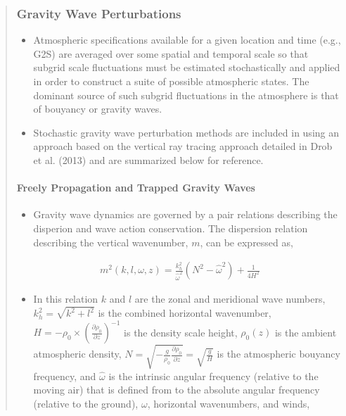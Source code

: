 \documentclass[letterpaper,10pt,english]{sphinxmanual}
\begin{document}
\begin{itemize}
\begin{quote}
\subsubsection{Gravity Wave Perturbations}
\label{\detokenize{gravity:gravity-wave-perturbations}}\label{\detokenize{gravity:gravity}}\label{\detokenize{gravity::doc}}\begin{itemize}
\item {} 
\sphinxAtStartPar
Atmospheric specifications available for a given location and time (e.g., G2S) are averaged over some spatial and temporal scale so that sub\sphinxhyphen{}grid scale fluctuations must be estimated stochastically and applied in order to construct a suite of possible atmospheric states.  The dominant source of such sub\sphinxhyphen{}grid fluctuations in the atmosphere is that of bouyancy or gravity waves.

\item {} 
\sphinxAtStartPar
Stochastic gravity wave perturbation methods are included in  using an approach based on the vertical ray tracing approach detailed in Drob et al. (2013) and are summarized below for reference.

\end{itemize}


\paragraph{Freely Propagation and Trapped Gravity Waves}
\label{\detokenize{gravity:freely-propagation-and-trapped-gravity-waves}}\begin{itemize}
\item {} 
\sphinxAtStartPar
Gravity wave dynamics are governed by a pair relations describing the disperion and wave action conservation.  The dispersion relation describing the vertical wavenumber, \(m\), can be expressed as,

\end{itemize}
\begin{equation*}
\begin{split}m^2 \left( k, l, \omega, z \right) = \frac{k_h^2}{\hat{\omega}^2} \left( N^2 - \hat{\omega}^2 \right) + \frac{1}{4H^2}\end{split}
\end{equation*}\begin{itemize}
\item {} 
\sphinxAtStartPar
In this relation \(k\) and \(l\) are the zonal and meridional wave numbers, \(k_h^2 = \sqrt{k^2 + l^2}\) is the combined horizontal wavenumber, \(H = - \rho_0 \times \left( \frac{\partial \rho_0}{\partial z} \right)^{-1}\) is the density scale height, \(\rho_0 \left( z \right)\) is the ambient atmospheric density, \(N = \sqrt{-\frac{g}{\rho_0} \frac{\partial \rho_0}{\partial z}} = \sqrt{\frac{g}{H}}\) is the atmospheric bouyancy frequency, and \(\hat{\omega}\) is the intrinsic angular frequency (relative to the moving air) that is defined from to the absolute angular frequency (relative to the ground), \(\omega\), horizontal wavenumbers, and winds,


\end{itemize}
\end{quote}
\end{itemize}
\end{document}
